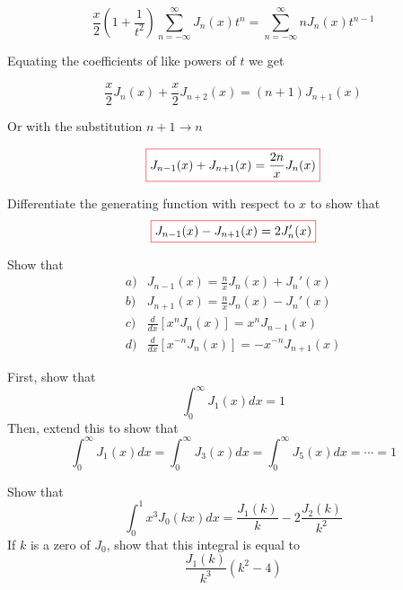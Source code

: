 \begin{equation}
\frac{x}{2}\left({1 + \frac{1}{t^2}}\right) \sum_{n = - \infty}^{\infty} J_n(x)t^n = \sum_{n = - \infty}^{\infty} n J_n(x)t^{n-1}
\end{equation} 

Equating the coefficients of like powers of $t$ we get

\begin{equation}
\frac{x}{2} J_n(x) + \frac{x}{2} J_{n+2}(x) = (n+1)J_{n+1}(x)
\end{equation} 

Or with the substitution $n+1 \to n$

\begin{equation}
\fbox{$\displaystyle
J_{n-1}(x) + J_{n+1}(x) = \frac{2n}{x} J_n(x)
$}
\end{equation} 

\begin{sidebar}
\begin{ex}
Differentiate the generating function with respect to $x$ to show that
$$\fbox{$\displaystyle J_{n-1}(x) - J_{n+1}(x) = 2 J_n'(x)$}$$ \label{ex-recur}
\end{ex}
\end{sidebar}

\begin{sidebar}
\begin{ex}
Show that
$$\begin{array}{lcll}a) & J_{n-1}(x) = \frac{n}{x}J_n(x) + J_n'(x) \\b) & J_{n+1}(x) = \frac{n}{x}J_n(x) - J_n'(x) \\c) & \frac{d}{dx}\left[x^n J_n(x)\right] = x^n J_{n-1}(x) \\d) & \frac{d}{dx}\left[x^{-n} J_n(x)\right] = -x^{-n} J_{n+1}(x)\end{array}$$ \label{ex-recurrence}
\end{ex}
\end{sidebar}


\begin{sidebar}
\begin{ex}
First, show that
$$\int_0^\infty J_1( x) dx =  1$$
Then, extend this to show that
$$\int_0^\infty J_1( x) dx = \int_0^\infty J_3( x) dx = \int_0^\infty J_5( x) dx = \cdots = 1$$
\end{ex}
\end{sidebar}

\begin{sidebar}
\begin{ex}
Show that
$$\int_0^1 x^3 J_0(k x) dx =  \frac{J_1(k)}{k} - 2 \frac{J_2(k)}{k^2}$$
If $k$ is a zero of $J_0$, show that this integral is equal to
$$\frac{J_1(k)}{k^3}\left(k^2-4\right)$$
\end{ex}
\end{sidebar}

